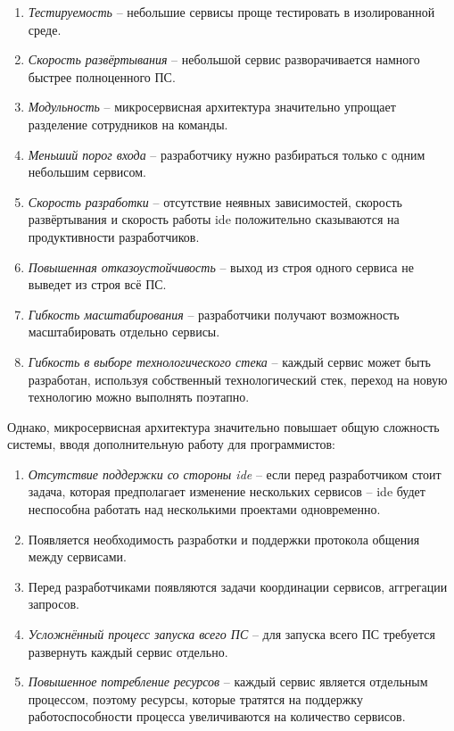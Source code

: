 \begin{enumerate}
	\item \emph{Тестируемость} -- небольшие сервисы проще тестировать в изолированной среде.
	\item \emph{Скорость развёртывания} -- небольшой сервис разворачивается намного быстрее полноценного ПС.
	\item \emph{Модульность} -- микросервисная архитектура значительно упрощает разделение сотрудников на команды.
	\item \emph{Меньший порог входа} -- разработчику нужно разбираться только с одним небольшим сервисом.
	\item \emph{Скорость разработки} -- отсутствие неявных зависимостей, скорость развёртывания и скорость работы \gls{ide} положительно сказываются на продуктивности разработчиков.
	\item \emph{Повышенная отказоустойчивость} -- выход из строя одного сервиса не выведет из строя всё ПС.
	\item \emph{Гибкость масштабирования} -- разработчики получают возможность масштабировать отдельно сервисы.
	\item \emph{Гибкость в выборе технологического стека} -- каждый сервис может быть разработан, используя собственный технологический стек, переход на новую технологию можно выполнять поэтапно.
\end{enumerate}

Однако, микросервисная архитектура значительно повышает общую сложность системы, вводя дополнительную работу для программистов:

\begin{enumerate}
	\item \emph{Отсутствие поддержки со стороны \gls{ide}} -- если перед разработчиком стоит задача, которая предполагает изменение нескольких сервисов -- \gls{ide} будет неспособна работать над несколькими проектами одновременно.
	\item Появляется необходимость разработки и поддержки протокола общения между сервисами.
	\item Перед разработчиками появляются задачи координации сервисов, аггрегации запросов.
	\item \emph{Усложнённый процесс запуска всего ПС} -- для запуска всего ПС требуется развернуть каждый сервис отдельно.
	\item \emph{Повышенное потребление ресурсов} -- каждый сервис является отдельным процессом, поэтому ресурсы, которые тратятся на поддержку работоспособности процесса увеличиваются на количество сервисов.
\end{enumerate}


